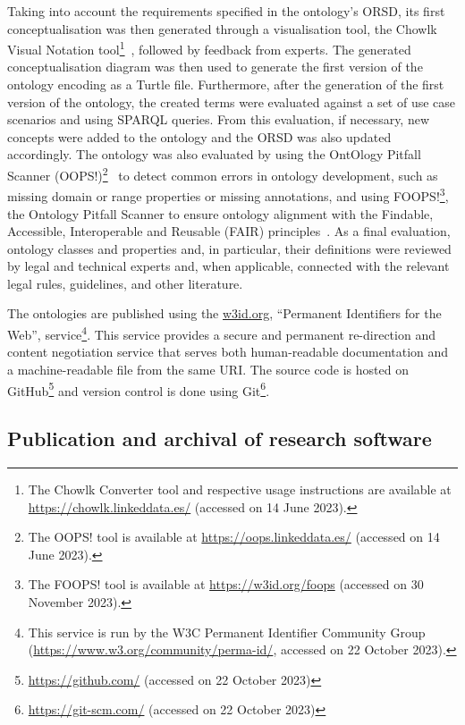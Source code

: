 Taking into account the requirements specified in the ontology's ORSD, its first conceptualisation was then generated through a visualisation tool, the Chowlk Visual Notation tool\footnote{The Chowlk Converter tool and respective usage instructions are available at \url{https://chowlk.linkeddata.es/} (accessed on 14 June 2023).}~\citep{chavez-feria_chowlk_2022}, followed by feedback from experts. The generated conceptualisation diagram was then used to generate the first version of the ontology encoding as a Turtle file.
Furthermore, after the generation of the first version of the ontology, the created terms were evaluated against a set of use case scenarios and using SPARQL queries. From this evaluation, if necessary, new concepts were added to the ontology and the ORSD was also updated accordingly. The ontology was also evaluated by using the OntOlogy Pitfall Scanner (OOPS!)\footnote{The OOPS! tool is available at \url{https://oops.linkeddata.es/} (accessed on 14 June 2023).}~\citep{poveda-villalon_oops_2014} to detect common errors in ontology development, such as missing domain or range properties or missing annotations, and using FOOPS!\footnote{The FOOPS! tool is available at \url{https://w3id.org/foops} (accessed on 30 November 2023).}, the Ontology Pitfall Scanner to ensure ontology alignment with the Findable, Accessible, Interoperable and Reusable (FAIR) principles~\citep{garijo_foops_2021}.
As a final evaluation, ontology classes and properties and, in particular, their definitions were reviewed by legal and technical experts and, when applicable, connected with the relevant legal rules, guidelines, and other literature.

The ontologies are published using the \url{w3id.org}, ``Permanent Identifiers for the Web'', service\footnote{This service is run by the W3C Permanent Identifier Community Group (\url{https://www.w3.org/community/perma-id/}, accessed on 22 October 2023).}.
This service provides a secure and permanent re-direction and content negotiation service that serves both human-readable documentation and a machine-readable file from the same URI.
The source code is hosted on GitHub\footnote{\url{https://github.com/} (accessed on 22 October 2023)} and version control is done using Git\footnote{\url{https://git-scm.com/} (accessed on 22 October 2023)}.


\subsection{Publication and archival of research software}
\label{sec:code_preservation}


